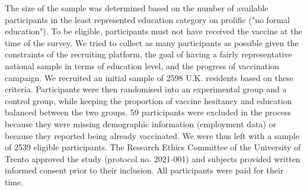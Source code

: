 \documentclass[authordate, empirical]{jote-new-article}
\begin{document}
The size of the sample was determined based on the number of available participants in the least represented education category on prolific ("no formal education"). To be eligible, participants must not have received the vaccine at the time of the survey. We tried to collect as many participants as possible given the constraints of the recruiting platform, the goal of having a fairly representative national sample in terms of education level, and the progress of vaccination campaign. We recruited an initial sample of 2598 U.K. residents based on these criteria. Participants were then randomised into an experimental group and a control group, while keeping the proportion of vaccine hesitancy and education balanced between the two groups. 59 participants were excluded in the process because they were missing demographic information (employment data) or because they reported being already vaccinated. We were thus left with a sample of 2539 eligible participants. The Research Ethics Committee of the University of Trento approved the study (protocol no. 2021-001) and subjects provided written informed consent prior to their inclusion. All participants were paid for their time.
\end{document}
